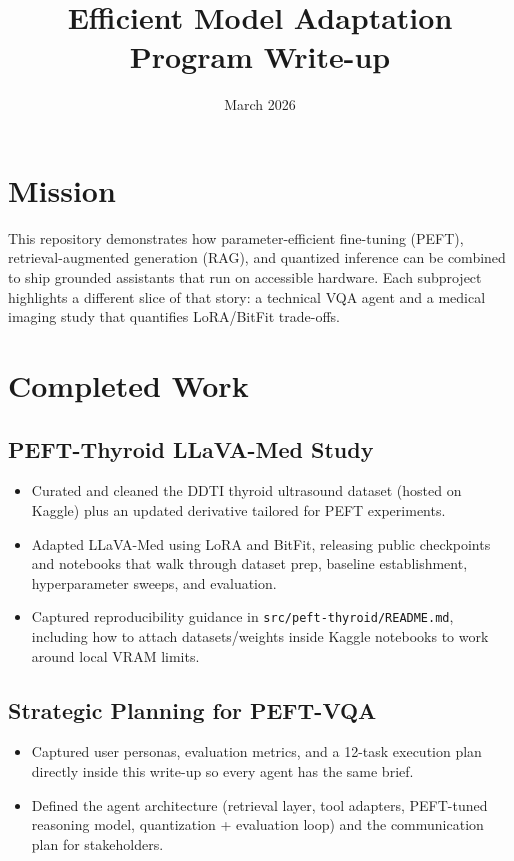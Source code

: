 \documentclass[11pt]{article}
\title{Efficient Model Adaptation Program Write-up}
\author{ }
\date{March 2026}
\begin{document}
\maketitle

\section{Mission}
This repository demonstrates how parameter-efficient fine-tuning (PEFT),
retrieval-augmented generation (RAG), and quantized inference can be
combined to ship grounded assistants that run on accessible hardware.
Each subproject highlights a different slice of that story: a technical
VQA agent and a medical imaging study that quantifies LoRA/BitFit
trade-offs.

\section{Completed Work}
\subsection{PEFT-Thyroid LLaVA-Med Study}
\begin{itemize}[leftmargin=*]
\item Curated and cleaned the DDTI thyroid ultrasound dataset (hosted on
    Kaggle) plus an updated derivative tailored for PEFT experiments.
\item Adapted LLaVA-Med using LoRA and BitFit, releasing public
    checkpoints and notebooks that walk through dataset prep, baseline
    establishment, hyperparameter sweeps, and evaluation.
\item Captured reproducibility guidance in
    \texttt{src/peft-thyroid/README.md}, including how to attach
    datasets/weights inside Kaggle notebooks to work around local VRAM
    limits.
\end{itemize}

\subsection{Strategic Planning for PEFT-VQA}
\begin{itemize}[leftmargin=*]
\item Captured user personas, evaluation metrics, and a 12-task execution
    plan directly inside this write-up so every agent has the same brief.
\item Defined the agent architecture (retrieval layer, tool adapters,
    PEFT-tuned reasoning model, quantization + evaluation loop) and the
    communication plan for stakeholders.
\end{itemize}
\end{document}
